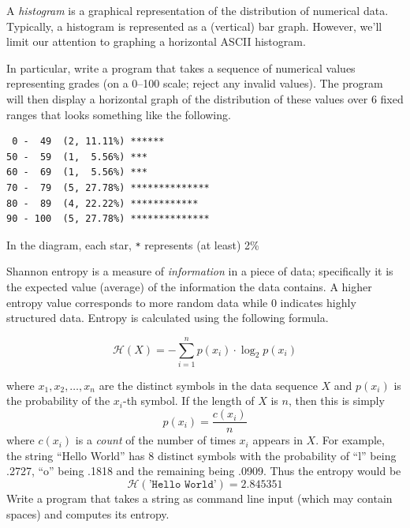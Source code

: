 \begin{exer}
A \emph{histogram} is a graphical representation of the distribution of 
numerical data. Typically, a histogram is represented as a (vertical) bar graph.  
However, we'll limit our attention to graphing a horizontal ASCII histogram.  

In particular, write a program that takes a sequence of numerical values representing
grades (on a 0--100 scale; reject any invalid values).  The program will then display
a horizontal graph of the distribution of these values over 6 fixed ranges that looks 
something like the following.

\begin{verbatim}
 0 -  49  (2, 11.11%) ******
50 -  59  (1,  5.56%) ***
60 -  69  (1,  5.56%) ***
70 -  79  (5, 27.78%) **************
80 -  89  (4, 22.22%) ************
90 - 100  (5, 27.78%) **************
\end{verbatim}

In the diagram, each star, \texttt{*} represents (at least) 2\% 
\end{exer}

\begin{exer}
Shannon entropy is a measure of \emph{information} in a piece of data; 
specifically it is the expected value (average) of the information the data contains.
A higher entropy value corresponds to more random data while 0 indicates
highly structured data.  Entropy is calculated using the following formula.

$$\mathcal{H}(X) = - \sum_{i=1}^n p(x_i) \cdot \log_2{p(x_i)}$$

where $x_1, x_2, \ldots, x_n$ are the distinct symbols in the data sequence $X$
and $p(x_i)$ is the probability of the $x_i$-th symbol.  If the length of $X$ is
$n$, then this is simply
  $$p(x_i) = \frac{c(x_i)}{n}$$
where $c(x_i)$ is a \emph{count} of the number of times $x_i$ appears in $X$.
For example, the string ``Hello World'' has 8 distinct symbols with the probability
of ``l'' being .2727, ``o'' being .1818 and the remaining being .0909.  Thus
the entropy would be
  $$\mathcal{H}(\texttt{'Hello World'}) = 2.845351$$
Write a program that takes a string as command line input (which may contain spaces)
and computes its entropy.  
\end{exer}

